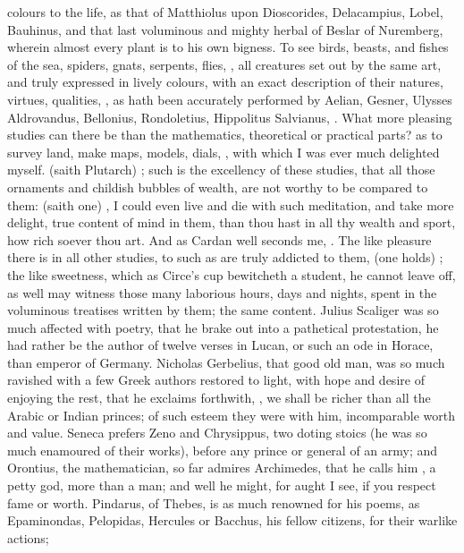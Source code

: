 {colours to the life, as that of Matthiolus upon Dioscorides, Delacampius, Lobel, Bauhinus, and that last voluminous and mighty herbal of Beslar of Nuremberg, wherein almost every plant is to his own bigness. To see birds, beasts, and fishes of the sea, spiders, gnats, serpents, flies, \etc{}, all creatures set out by the same art, and truly expressed in lively colours, with an exact description of their natures, virtues, qualities, \etc{}, as hath been accurately performed by Aelian, Gesner, Ulysses Aldrovandus, Bellonius, Rondoletius, Hippolitus Salvianus, \etc{} . What more pleasing studies can there be than the mathematics, theoretical or practical parts? as to survey land, make maps, models, dials, \etc{}, with which I was ever much delighted myself.  (saith Plutarch) ; such is the excellency of these studies, that all those ornaments and childish bubbles of wealth, are not worthy to be compared to them:  (saith one) , I could even live and die with such meditation, and take more delight, true content of mind in them, than thou hast in all thy wealth and sport, how rich soever thou art. And as Cardan well seconds me, . The like pleasure there is in all other studies, to such as are truly addicted to them,  (one holds) ; the like sweetness, which as Circe's cup bewitcheth a student, he cannot leave off, as well may witness those many laborious hours, days and nights, spent in the voluminous treatises written by them; the same content. Julius Scaliger was so much affected with poetry, that he brake out into a pathetical protestation, he had rather be the author of twelve verses in Lucan, or such an ode in Horace, than emperor of Germany. Nicholas Gerbelius, that good old man, was so much ravished with a few Greek authors restored to light, with hope and desire of enjoying the rest, that he exclaims forthwith, , we shall be richer than all the Arabic or Indian princes; of such esteem they were with him, incomparable worth and value. Seneca prefers Zeno and Chrysippus, two doting stoics (he was so much enamoured of their works), before any prince or general of an army; and Orontius, the mathematician, so far admires Archimedes, that he calls him , a petty god, more than a man; and well he might, for aught I see, if you respect fame or worth. Pindarus, of Thebes, is as much renowned for his poems, as Epaminondas, Pelopidas, Hercules or Bacchus, his fellow citizens, for their warlike actions; }

